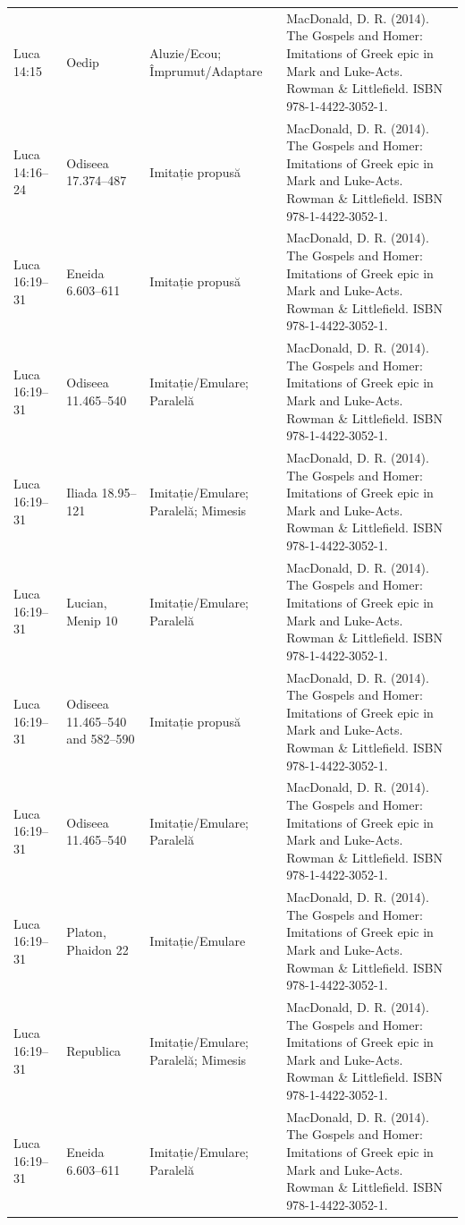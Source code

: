 \documentclass[12pt,a4paper,twoside,openany]{book}
\begin{document}
\begin{longtable}{L{1.4cm}L{1.7cm}L{3.1cm}L{8.4cm}}
Luca 14:15 & Oedip & Aluzie/Ecou; Împrumut/Adaptare & MacDonald, D. R. (2014). The Gospels and Homer: Imitations of Greek epic in Mark and Luke-Acts. Rowman \& Littlefield. ISBN 978-1-4422-3052-1. \\
Luca 14:16–24 & Odiseea 17.374–487 & Imitație propusă & MacDonald, D. R. (2014). The Gospels and Homer: Imitations of Greek epic in Mark and Luke-Acts. Rowman \& Littlefield. ISBN 978-1-4422-3052-1. \\
Luca 16:19–31 & Eneida 6.603–611 & Imitație propusă & MacDonald, D. R. (2014). The Gospels and Homer: Imitations of Greek epic in Mark and Luke-Acts. Rowman \& Littlefield. ISBN 978-1-4422-3052-1. \\
Luca 16:19–31 & Odiseea 11.465–540 & Imitație/Emulare; Paralelă & MacDonald, D. R. (2014). The Gospels and Homer: Imitations of Greek epic in Mark and Luke-Acts. Rowman \& Littlefield. ISBN 978-1-4422-3052-1. \\
Luca 16:19–31 & Iliada 18.95–121 & Imitație/Emulare; Paralelă; Mimesis & MacDonald, D. R. (2014). The Gospels and Homer: Imitations of Greek epic in Mark and Luke-Acts. Rowman \& Littlefield. ISBN 978-1-4422-3052-1. \\
Luca 16:19–31 & Lucian, Menip 10 & Imitație/Emulare; Paralelă & MacDonald, D. R. (2014). The Gospels and Homer: Imitations of Greek epic in Mark and Luke-Acts. Rowman \& Littlefield. ISBN 978-1-4422-3052-1. \\
Luca 16:19–31 & Odiseea 11.465–540 and 582–590 & Imitație propusă & MacDonald, D. R. (2014). The Gospels and Homer: Imitations of Greek epic in Mark and Luke-Acts. Rowman \& Littlefield. ISBN 978-1-4422-3052-1. \\
Luca 16:19–31 & Odiseea 11.465–540 & Imitație/Emulare; Paralelă & MacDonald, D. R. (2014). The Gospels and Homer: Imitations of Greek epic in Mark and Luke-Acts. Rowman \& Littlefield. ISBN 978-1-4422-3052-1. \\
Luca 16:19–31 & Platon, Phaidon 22 & Imitație/Emulare & MacDonald, D. R. (2014). The Gospels and Homer: Imitations of Greek epic in Mark and Luke-Acts. Rowman \& Littlefield. ISBN 978-1-4422-3052-1. \\
Luca 16:19–31 & Republica & Imitație/Emulare; Paralelă; Mimesis & MacDonald, D. R. (2014). The Gospels and Homer: Imitations of Greek epic in Mark and Luke-Acts. Rowman \& Littlefield. ISBN 978-1-4422-3052-1. \\
Luca 16:19–31 & Eneida 6.603–611 & Imitație/Emulare; Paralelă & MacDonald, D. R. (2014). The Gospels and Homer: Imitations of Greek epic in Mark and Luke-Acts. Rowman \& Littlefield. ISBN 978-1-4422-3052-1. \\

\end{longtable}
\end{document}
